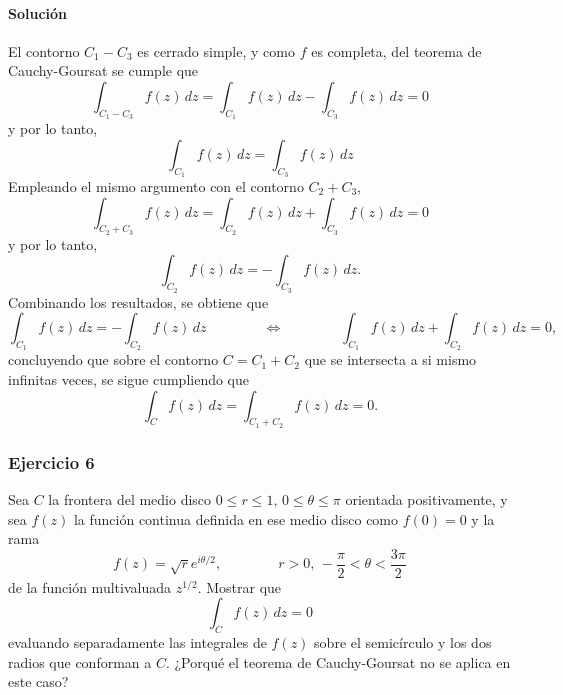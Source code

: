 \documentclass[a4paper]{report}
\begin{document}
\paragraph{Solución} El contorno \(C_1-C_3\) es cerrado simple, y como \(f\) es completa, del teorema de Cauchy-Goursat se cumple que 
\[
 \int_{C_1-C_3}f(z)\,dz=\int_{C_1}f(z)\,dz-\int_{C_3}f(z)\,dz=0
\]
y por lo tanto,
\[
 \int_{C_1}f(z)\,dz=\int_{C_3}f(z)\,dz
\]
Empleando el mismo argumento con el contorno \(C_2+C_3\),
\[
 \int_{C_2+C_3}f(z)\,dz=\int_{C_2}f(z)\,dz+\int_{C_3}f(z)\,dz=0
\]
y por lo tanto,
\[
 \int_{C_2}f(z)\,dz=-\int_{C_3}f(z)\,dz.
\]
Combinando los resultados, se obtiene que 
\[
 \int_{C_1}f(z)\,dz=-\int_{C_2}f(z)\,dz
 \qquad\qquad\Leftrightarrow\qquad\qquad 
 \int_{C_1}f(z)\,dz+\int_{C_2}f(z)\,dz=0,
\]
concluyendo que sobre el contorno \(C=C_1+C_2\) que se intersecta a si mismo infinitas veces, se sigue cumpliendo que 
\[
 \int_{C}f(z)\,dz=\int_{C_1+C_2}f(z)\,dz=0.
\]

\subsubsection*{Ejercicio 6}

Sea \(C\) la frontera del medio disco \(0\leq r\leq 1,\, 0\leq\theta\leq\pi\) orientada positivamente, y sea \(f(z)\) la función continua definida en ese medio disco como \(f(0)=0\) y la rama
\[
 f(z)=\sqrt{r}e^{i\theta/2},
 \qquad\qquad
 r>0,\,-\frac{\pi}{2}<\theta<\frac{3\pi}{2}
\]
de la función multivaluada \(z^{1/2}\). Mostrar que 
\[
 \int_Cf(z)\,dz=0
\]
evaluando separadamente las integrales de \(f(z)\) sobre el semicírculo y los dos radios que conforman a \(C\). ¿Porqué el teorema de Cauchy-Goursat no se aplica en este caso?
\end{document}
